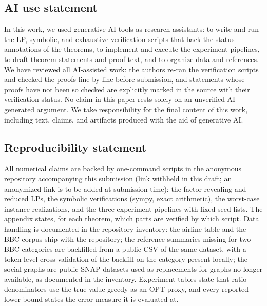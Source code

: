 
\subsection*{AI use statement}
In this work, we used generative AI tools as research assistants: to write
and run the LP, symbolic, and exhaustive verification scripts that back the
status annotations of the theorems, to implement and execute the experiment
pipelines, to draft theorem statements and proof text, and to organize data
and references.  We have reviewed all AI-assisted work: the authors re-ran
the verification scripts and checked the proofs line by line before
submission, and statements whose proofs have not been so checked are
explicitly marked in the source with their verification status.  No claim
in this paper rests solely on an unverified AI-generated argument.  We take
responsibility for the final content of this work, including text, claims,
and artifacts produced with the aid of generative AI.

\subsection*{Reproducibility statement}
All numerical claims are backed by one-command scripts in the anonymous
repository accompanying this submission (link withheld in this draft; an
anonymized link is to be added at submission time): the factor-revealing
and reduced LPs, the symbolic verifications (sympy, exact arithmetic), the
worst-case instance realizations, and the three experiment pipelines with
fixed seed lists.  The appendix states, for each theorem, which parts are
verified by which script.  Data handling is documented in the repository
inventory: the airline table and the BBC corpus ship with the repository;
the reference summaries missing for two BBC categories are backfilled from
a public CSV of the same dataset, with a token-level cross-validation of
the backfill on the category present locally; the social graphs are public
SNAP datasets used as replacements for graphs no longer available, as
documented in the inventory.  Experiment tables state that ratio
denominators use the true-value greedy as an OPT proxy, and every reported
lower bound states the error measure it is evaluated at.
